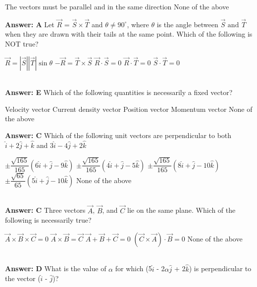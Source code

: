 \documentclass[12pt,addpoints]{exam}
\begin{document}
{{{\begin{questions}
\begin{choices}
						\choice The vectors must be parallel and in the same direction
						\choice None of the above
					\end{choices}
					\textbf{Answer: A}
					\question Let $\vec{R}$ = $\vec{S}\times\vec{T}$ and $\theta\neq90^\circ$, where $\theta$ is the angle between $\vec{S}\text{ and }\vec{T}$ when they are drawn with their tails at the same point. Which of the following is NOT true? \\
					\begin{oneparchoices}
						\choice $\vec{R}=|\vec{S}||\vec{T}|\sin\theta$
						\choice $-\vec{R}=\vec{T}\times\vec{S}$
						\choice $\vec{R}\cdot\vec{S}=0$
						\choice $\vec{R}\cdot\vec{T}=0$
						\choice $\vec{S}\cdot\vec{T}=0$
					\end{oneparchoices} 
					\\ \textbf{Answer: E}
					\question Which of the following quantities is necessarily a fixed vector? \\
					\begin{oneparchoices}
						\choice Velocity vector
						\choice Current density vector
						\choice Position vector
						\choice Momentum vector
						\choice None of the above
					\end{oneparchoices}
					\textbf{Answer: C}
					\question Which of the following unit vectors are perpendicular to both $\hat{i}+2\hat{j}+\hat{k}$ and $3\hat{i}-4\hat{j}+2\hat{k}$
					\begin{oneparchoices}
						\choice $\pm\dfrac{\sqrt{165}}{165}(6\hat{i}+\hat{j}-9\hat{k})$
						\choice $\pm\dfrac{\sqrt{165}}{165}(4\hat{i}+\hat{j}-5\hat{k})$
						\choice $\pm\dfrac{\sqrt{165}}{165}(8\hat{i}+\hat{j}-10\hat{k})$
						\choice $\pm\dfrac{\sqrt{65}}{65}(5\hat{i}+\hat{j}-10\hat{k})$
						\choice None of the above
					\end{oneparchoices}
					\\ \textbf{Answer: C}
					\question Three vectors $\vec{A}$, $\vec{B}$, and $\vec{C}$ lie on the same plane. Which of the following is necessarily true?
					\begin{oneparchoices}
						\choice $\vec{A}\times\vec{B}\times\vec{C}=0$
						\choice $\vec{A}\times\vec{B}=\vec{C}$
						\choice $\vec{A}+\vec{B}+\vec{C}=0$
						\choice $(\vec{C}\times\vec{A})\cdot\vec{B}=0$
						\choice None of the above
					\end{oneparchoices} 
					\\ \textbf{Answer: D}
					\question What is the value of $\alpha$ for which (5$\hat{i}$ - 2$\alpha$$\hat{j}$ + 2$\hat{k}$) is perpendicular to the vector ($\hat{i}$ - $\hat{j}$)? \\
$$
\end{questions}}}}
\end{document}
